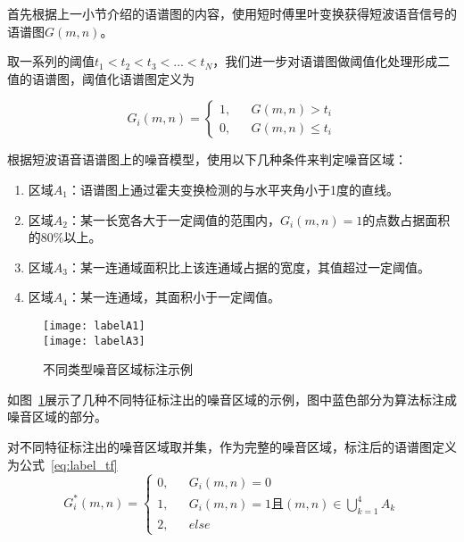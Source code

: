 首先根据上一小节介绍的语谱图的内容，使用短时傅里叶变换获得短波语音信号的语谱图$G(m,n)$。

取一系列的阈值$t_1<t_2<t_3<...<t_N$，我们进一步对语谱图做阈值化处理形成二值的语谱图，阈值化语谱图定义为

\begin{equation}\label{eq:thr_tf}
G_i(m, n) = \left\{
    \begin{array}{rcl}
    1, && {G(m,n)>t_i} \\
    0, && {G(m,n)\leq t_i}
    \end{array} \right.
\end{equation}

根据短波语音语谱图上的噪音模型，使用以下几种条件来判定噪音区域：
\begin{enumerate}
\item 区域$A_1$：语谱图上通过霍夫变换检测的与水平夹角小于1度的直线。
\item 区域$A_2$：某一长宽各大于一定阈值的范围内，$G_i(m,n)=1$的点数占据面积的80\%以上。
\item 区域$A_3$：某一连通域面积比上该连通域占据的宽度，其值超过一定阈值。
\item 区域$A_4$：某一连通域，其面积小于一定阈值。
\end{enumerate}

\begin{figure}
\centering
{} {
    \texttt{[image: labelA1]}
}
\vspace{0.8ex}
\\
 {
    \texttt{[image: labelA3]}
}
\vspace{0.8ex}
\\
\caption{不同类型噪音区域标注示例\label{fig:noise-labels}}
\end{figure}

如图~\ref{fig:noise-labels}展示了几种不同特征标注出的噪音区域的示例，图中蓝色部分为算法标注成噪音区域的部分。

对不同特征标注出的噪音区域取并集，作为完整的噪音区域，标注后的语谱图定义为公式~\ref{eq:label_tf}
\begin{equation}\label{eq:label_tf}
G_i^*(m, n) = \left\{
    \begin{array}{rcl}
    0, && {G_i(m,n)=0} \\
    1, && {G_i(m,n)=1且(m,n)\in \bigcup_{k=1}^4 A_k} \\
    2, && {else}
    \end{array} \right.
\end{equation}

